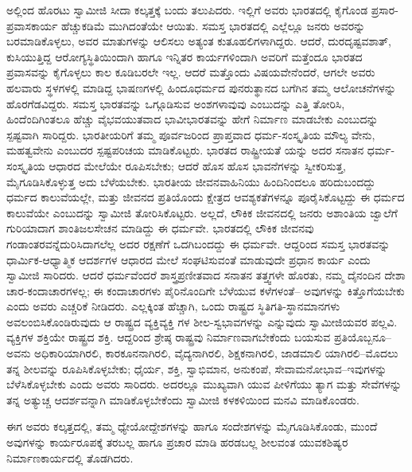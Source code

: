 ಅಲ್ಲಿಂದ ಹೊರಟು ಸ್ವಾಮೀಜಿ ಸೀದಾ ಕಲ್ಕತ್ತಕ್ಕೆ ಬಂದು ತಲುಪಿದರು. ಇಲ್ಲಿಗೆ ಅವರು ಭಾರತದಲ್ಲಿ ಕೈಗೊಂಡ ಪ್ರಸಾರ-ಪ್ರವಾಸಕಾರ್ಯ ಹೆಚ್ಚುಕಡಿಮೆ ಮುಗಿದಂತೆಯೇ ಆಯಿತು. ಸಮಸ್ತ ಭಾರತದಲ್ಲಿ ಎಲ್ಲೆಲ್ಲೂ ಜನರು ಅವರನ್ನು ಬರಮಾಡಿಕೊಳ್ಳಲು, ಅವರ ಮಾತುಗಳನ್ನು ಆಲಿಸಲು ಅತ್ಯಂತ ಕುತೂಹಲಿಗಳಾಗಿದ್ದರು. ಆದರೆ, ದುರದೃಷ್ಟವಶಾತ್, ಕುಸಿಯುತ್ತಿದ್ದ ಆರೋಗ್ಯಸ್ಥಿತಿಯಿಂದಾಗಿ ಹಾಗೂ ಇನ್ನಿತರ ಕಾರ್ಯಗಳಿಂದಾಗಿ ಅವರಿಗೆ ಮತ್ತೆಂದೂ ಭಾರತದ ಪ್ರವಾಸವನ್ನು ಕೈಗೊಳ್ಳಲು ಕಾಲ ಕೂಡಿಬರಲೇ ಇಲ್ಲ. ಆದರೆ ಮತ್ತೊಂದು ವಿಷಯವೇನೆಂದರೆ, ಆಗಲೇ ಅವರು ಹಲವಾರು ಸ್ಥಳಗಳಲ್ಲಿ ಮಾಡಿದ್ದ ಭಾಷಣಗಳಲ್ಲಿ ಹಿಂದೂಧರ್ಮದ ಪುನರುತ್ಥಾನದ ಬಗೆಗಿನ ತಮ್ಮ ಆಲೋಚನೆಗಳನ್ನು ಹೊರಗೆಡವಿದ್ದರು. ಸಮಸ್ತ ಭಾರತವನ್ನು ಒಗ್ಗೂಡಿಸುವ ಅಂಶಗಳಾವುವು ಎಂಬುದನ್ನು ಎತ್ತಿ ತೋರಿಸಿ, ಹಿಂದೆಂದಿಗಿಂತಲೂ ಹೆಚ್ಚು ವೈಭವಯುತವಾದ ಭಾವೀಭಾರತವನ್ನು ಹೇಗೆ ನಿರ್ಮಾಣ ಮಾಡಬೇಕು ಎಂಬುದನ್ನು ಸ್ಪಷ್ಟವಾಗಿ ಸಾರಿದ್ದರು. ಭಾರತೀಯರಿಗೆ ತಮ್ಮ ಪೂರ್ವಜರಿಂದ ಪ್ರಾಪ್ತವಾದ ಧರ್ಮ-ಸಂಸ್ಕೃತಿಯ ಮೌಲ್ಯ ವೇನು, ಮಹತ್ವವೇನು ಎಂಬುದರ ಸ್ಪಷ್ಟಪರಿಚಯ ಮಾಡಿಕೊಟ್ಟರು. ಭಾರತದ ರಾಷ್ಟ್ರೀಯತೆ ಯನ್ನು ಅದರ ಸನಾತನ ಧರ್ಮ-ಸಂಸ್ಕೃತಿಯ ಆಧಾರದ ಮೇಲೆಯೇ ರೂಪಿಸಬೇಕು; ಆದರೆ ಹೊಸ ಹೊಸ ಭಾವನೆಗಳನ್ನು ಸ್ವೀಕರಿಸುತ್ತ, ಮೈಗೂಡಿಸಿಕೊಳ್ಳುತ್ತ ಅದು ಬೆಳೆಯಬೇಕು. ಭಾರತೀಯ ಜೀವನವಾಹಿನಿಯು ಹಿಂದಿನಿಂದಲೂ ಹರಿದುಬಂದದ್ದು ಧರ್ಮದ ಕಾಲುವೆಯಲ್ಲೇ, ಮತ್ತು ಜೀವನದ ಪ್ರತಿಯೊಂದು ಕ್ಷೇತ್ರದ ಆವಶ್ಯಕತೆಗಳನ್ನೂ ಪೂರೈಸಿಕೊಟ್ಟದ್ದು ಈ ಧರ್ಮದ ಕಾಲುವೆಯೇ ಎಂಬುದನ್ನು ಸ್ವಾಮೀಜಿ ತೋರಿಸಿಕೊಟ್ಟರು. ಅಲ್ಲದೆ, ಲೌಕಿಕ ಜೀವನದಲ್ಲಿ ಜನರು ಅಶಾಂತಿಯ ಜ್ವಾಲೆಗೆ ಗುರಿಯಾದಾಗ ಶಾಂತಿಜಲಸೇಚನ ಮಾಡಿದ್ದು ಈ ಧರ್ಮವೇ. ಭಾರತದಲ್ಲಿ ಲೌಕಿಕ ಜೀವನವು ಗಂಡಾಂತರವನ್ನೆದುರಿಸಿದಾಗಲೆಲ್ಲ ಅದರ ರಕ್ಷಣೆಗೆ ಒದಗಿಬಂದದ್ದು ಈ ಧರ್ಮವೇ. ಆದ್ದರಿಂದ ಸಮಸ್ತ ಭಾರತವನ್ನು ಧಾರ್ಮಿಕ-ಆಧ್ಯಾತ್ಮಿಕ ಆದರ್ಶಗಳ ಆಧಾರದ ಮೇಲೆ ಸಂಘಟಿಸುವಂತೆ ಮಾಡುವುದೇ ಪ್ರಧಾನ ಕಾರ್ಯ ಎಂದು ಸ್ವಾಮೀಜಿ ಸಾರಿದರು. ಆದರೆ ಧರ್ಮವೆಂದರೆ ಶಾಸ್ತ್ರಪ್ರಣೀತವಾದ ಸನಾತನ ತತ್ತ್ವಗಳೇ ಹೊರತು, ನಮ್ಮ ದೈನಂದಿನ ದೇಶಾ ಚಾರ-ಕಂದಾಚಾರಗಳಲ್ಲ; ಈ ಕಂದಾಚಾರಗಳು ಪೈರಿನೊಂದಿಗೇ ಬೆಳೆಯುವ ಕಳೆಗಳಂತೆ– ಅವುಗಳನ್ನು ಕಿತ್ತೊಗೆಯಬೇಕು ಎಂದು ಅವರು ಎಚ್ಚರಿಕೆ ನೀಡಿದರು. ಎಲ್ಲಕ್ಕಿಂತ ಹೆಚ್ಚಾಗಿ, ಒಂದು ರಾಷ್ಟ್ರದ ಸ್ಥಿತಿಗತಿ-ಸ್ಥಾನಮಾನಗಳು ಅವಲಂಬಿಸಿಕೊಂಡಿರುವುದು ಆ ರಾಷ್ಟ್ರದ ವ್ಯಕ್ತಿವ್ಯಕ್ತಿ ಗಳ ಶೀಲ-ಸ್ವಭಾವಗಳನ್ನು ಎನ್ನುವುದು ಸ್ವಾಮೀಜಿಯವರ ಪಲ್ಲವಿ. ವ್ಯಕ್ತಿಗಳ ಶಕ್ತಿಯೇ ರಾಷ್ಟ್ರದ ಶಕ್ತಿ. ಆದ್ದರಿಂದ ಶ್ರೇಷ್ಠ ರಾಷ್ಟ್ರವು ನಿರ್ಮಾಣವಾಗಬೇಕೆಂದು ಬಯಸುವ ಪ್ರತಿಯೊಬ್ಬನೂ– ಅವನು ಅಧಿಕಾರಿಯಾಗಿರಲಿ, ಕಾರಕೂನನಾಗಿರಲಿ, ವೈದ್ಯನಾಗಿರಲಿ, ಶಿಕ್ಷಕನಾಗಿರಲಿ, ಜಾಡಮಾಲಿ ಯಾಗಿರಲಿ–ಮೊದಲು ತನ್ನ ಶೀಲವನ್ನು ರೂಪಿಸಿಕೊಳ್ಳಬೇಕು; ಧೈರ್ಯ, ಶಕ್ತಿ, ಸ್ವಾಭಿಮಾನ, ಅನುಕಂಪೆ, ಸೇವಾಮನೋಭಾವ–ಇವುಗಳನ್ನು ಬೆಳೆಸಿಕೊಳ್ಳಬೇಕು ಎಂದು ಅವರು ಸಾರಿದರು. ಅದರಲ್ಲೂ ಮುಖ್ಯವಾಗಿ ಯುವ ಪೀಳಿಗೆಯು ತ್ಯಾಗ ಮತ್ತು ಸೇವೆಗಳನ್ನು ತನ್ನ ಅತ್ಯುಚ್ಚ ಆದರ್ಶವನ್ನಾಗಿ ಮಾಡಿಕೊಳ್ಳಬೇಕೆಂದು ಸ್ವಾಮೀಜಿ ಕಳಕಳಿಯಿಂದ ಮನವಿ ಮಾಡಿಕೊಂಡರು.

ಈಗ ಅವರು ಕಲ್ಕತ್ತದಲ್ಲಿ, ತಮ್ಮ ಧ್ಯೇಯೋದ್ದೇಶಗಳನ್ನು ಹಾಗೂ ಸಂದೇಶಗಳನ್ನು ಮೈಗೂಡಿಸಿಕೊಂಡು, ಮುಂದೆ ಅವುಗಳನ್ನು ಕಾರ್ಯರೂಪಕ್ಕೆ ತರಬಲ್ಲ ಹಾಗೂ ಪ್ರಚಾರ ಮಾಡಿ ಹರಡಬಲ್ಲ ಶೀಲವಂತ ಯುವಕಶಿಷ್ಯರ ನಿರ್ಮಾಣಕಾರ್ಯದಲ್ಲಿ ತೊಡಗಿದರು.


